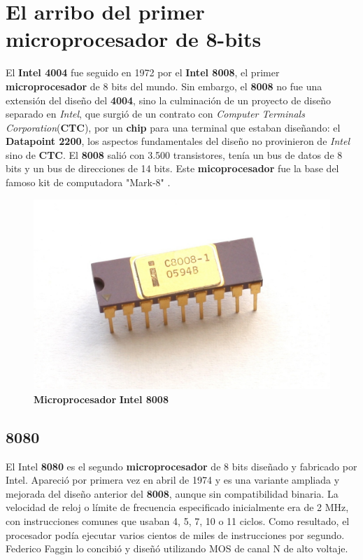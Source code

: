 \section{El arribo del primer microprocesador de 8-bits}
El \textbf{Intel 4004} fue seguido en 1972 por el \textbf{Intel 8008}, el primer \textbf{microprocesador} de 8 bits del mundo.
Sin embargo, el \textbf{8008} no fue una extensión del diseño del \textbf{4004}, sino la culminación de un proyecto de diseño separado
en \emph{Intel}, que surgió de un contrato con \emph{Computer Terminals Corporation}(\textbf{CTC}), por un \textbf{chip} para
una terminal que estaban diseñando: el \textbf{Datapoint 2200}, los aspectos fundamentales del diseño no provinieron de \emph{Intel}
sino de \textbf{CTC}. El \textbf{8008} salió con 3.500 transistores, tenía un bus de datos de 8 bits y un bus de direcciones de 14 bits. Este
\textbf{micoprocesador} fue la base del famoso kit de computadora "Mark-8" .

\begin{figure}[htb]
	\centering
	\includegraphics[scale = 0.15]{Graphics/Intel_C8008-1.jpg}
	\caption{\textbf{Microprocesador}  \textbf{Intel 8008}}
	\label{fig:13}
\end{figure}

\subsection{8080}
El Intel \textbf{8080} es el segundo \textbf{microprocesador} de 8 bits diseñado y fabricado por Intel. Apareció por primera vez en abril de
1974 y es una variante ampliada y mejorada del diseño anterior del \textbf{8008}, aunque sin compatibilidad binaria. La velocidad de reloj o
límite de frecuencia especificado inicialmente era de 2 MHz, con instrucciones comunes que usaban 4, 5, 7, 10 o 11 ciclos. Como resultado,
el procesador podía ejecutar varios cientos de miles de instrucciones por segundo. Federico Faggin lo concibió y diseñó utilizando MOS de
canal N de alto voltaje.

